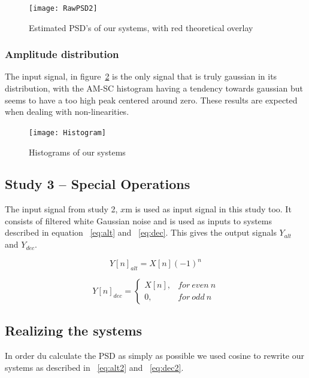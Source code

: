 \documentclass[10pt]{article}
\begin{document}
\begin{figure}[!hp]

    \begin{center}
      \texttt{[image: RawPSD2]}
    \caption{Estimated PSD's of our systems, with red theoretical overlay \label{fig:RawPSD2}}
    \end{center}

\end{figure}

\subsubsection{Amplitude distribution}
The input signal, in figure~\ref{fig:hist} is the only signal that is truly gaussian in its distribution,
with the AM-SC histogram having a tendency towards gaussian but seems to have a
too high peak centered around zero. These results are expected when dealing with
non-linearities.

\begin{figure}[!hp]

    \begin{center}
      \texttt{[image: Histogram]}
    \caption{Histograms of our systems \label{fig:hist}}
    \end{center}

\end{figure}


\clearpage

\subsection{Study 3 – Special Operations}
The input signal from study 2, $x$m is used as input signal in this study too. It consists of 
filtered white Gaussian noise and is used as inputs to systems described in equation ~\ref{eq:alt}
and ~\ref{eq:dec}. This gives the output signals $Y_{alt}$ and $Y_{dec}$.

\begin{equation}
  \label{eq:alt}
  Y[n]_{alt} =X[n](-1)^n
\end{equation}

\begin{equation}
  \label{eq:dec}
  Y[n]_{dec} =
\begin{cases}
   X[n],& for~even~n\\
    0,    & for~odd~n
\end{cases}
\end{equation}

\subsection{Realizing the systems}
In order du calculate the PSD as simply as possible we used cosine to rewrite our systems as described
in ~\ref{eq:alt2} and ~\ref{eq:dec2}.
\end{document}
